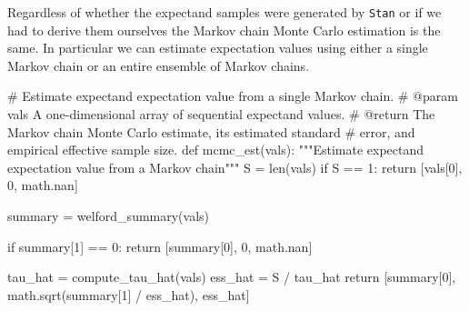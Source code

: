 \documentclass[
  letterpaper,
  DIV=11,
  numbers=noendperiod]{scrartcl}
\newenvironment{Shaded}{\begin{snugshade}}{\end{snugshade}}
\newcommand{\BuiltInTok}[1]{\textcolor[rgb]{0.00,0.23,0.31}{#1}}
\newcommand{\CommentTok}[1]{\textcolor[rgb]{0.37,0.37,0.37}{#1}}
\newcommand{\ControlFlowTok}[1]{\textcolor[rgb]{0.00,0.23,0.31}{#1}}
\newcommand{\DecValTok}[1]{\textcolor[rgb]{0.68,0.00,0.00}{#1}}
\newcommand{\KeywordTok}[1]{\textcolor[rgb]{0.00,0.23,0.31}{#1}}
\newcommand{\NormalTok}[1]{\textcolor[rgb]{0.00,0.23,0.31}{#1}}
\newcommand{\OperatorTok}[1]{\textcolor[rgb]{0.37,0.37,0.37}{#1}}
\begin{document}
Regardless of whether the expectand samples were generated by
\texttt{Stan} or if we had to derive them ourselves the Markov chain
Monte Carlo estimation is the same. In particular we can estimate
expectation values using either a single Markov chain or an entire
ensemble of Markov chains.

\begin{Shaded}
\begin{Highlighting}[]
\CommentTok{\# Estimate expectand expectation value from a single Markov chain.}
\CommentTok{\# @param vals A one{-}dimensional array of sequential expectand values.}
\CommentTok{\# @return The Markov chain Monte Carlo estimate, its estimated standard}
\CommentTok{\#         error, and empirical effective sample size.}
\KeywordTok{def}\NormalTok{ mcmc\_est(vals):}
  \CommentTok{"""Estimate expectand expectation value from a Markov chain"""}
\NormalTok{  S }\OperatorTok{=} \BuiltInTok{len}\NormalTok{(vals)}
  \ControlFlowTok{if}\NormalTok{ S }\OperatorTok{==} \DecValTok{1}\NormalTok{:}
    \ControlFlowTok{return}\NormalTok{ [vals[}\DecValTok{0}\NormalTok{], }\DecValTok{0}\NormalTok{, math.nan]}

\NormalTok{  summary }\OperatorTok{=}\NormalTok{ welford\_summary(vals)}

  \ControlFlowTok{if}\NormalTok{ summary[}\DecValTok{1}\NormalTok{] }\OperatorTok{==} \DecValTok{0}\NormalTok{:}
    \ControlFlowTok{return}\NormalTok{ [summary[}\DecValTok{0}\NormalTok{], }\DecValTok{0}\NormalTok{, math.nan]}

\NormalTok{  tau\_hat }\OperatorTok{=}\NormalTok{ compute\_tau\_hat(vals)}
\NormalTok{  ess\_hat }\OperatorTok{=}\NormalTok{ S }\OperatorTok{/}\NormalTok{ tau\_hat}
  \ControlFlowTok{return}\NormalTok{ [summary[}\DecValTok{0}\NormalTok{], math.sqrt(summary[}\DecValTok{1}\NormalTok{] }\OperatorTok{/}\NormalTok{ ess\_hat), ess\_hat]}
\end{Highlighting}
\end{Shaded}
\end{document}
